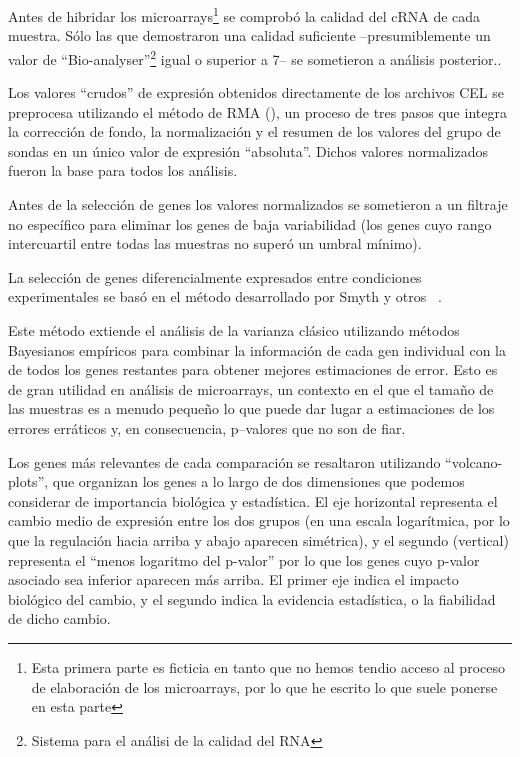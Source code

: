 \documentclass[a4paper]{article}\usepackage[]{graphicx}\usepackage[]{color}
\begin{document}
Antes de hibridar los microarrays\footnote{Esta primera parte es ficticia en tanto que no hemos tendio acceso al proceso de elaboración de los microarrays, por lo que he escrito lo que suele ponerse en esta parte} se comprobó la calidad del cRNA de cada muestra. Sólo las que demostraron una calidad suficiente --presumiblemente un valor de ``Bio-analyser''\footnote{Sistema para el análisi de la calidad del RNA} igual o superior a 7-- se sometieron a análisis posterior.. 

Los valores ``crudos'' de expresión obtenidos directamente de los archivos CEL se preprocesa utilizando el método de RMA (\cite{Irizarry:2003}), un proceso de tres pasos que integra la corrección de fondo, la normalización y el resumen de los valores del grupo de sondas en un único valor de expresión ``absoluta''. Dichos valores normalizados fueron la base para todos los análisis.

Antes de la selección de genes los valores normalizados se sometieron a un filtraje no específico para eliminar los genes de baja 
variabilidad (los genes cuyo rango intercuartil entre todas las muestras no superó un umbral mínimo).

La selección de genes diferencialmente expresados entre condiciones experimentales se basó en el método desarrollado por Smyth y otros ~\cite{Smyth:2004}.


Este método extiende el análisis de la varianza clásico utilizando métodos Bayesianos empíricos para combinar la información de cada gen individual con la de todos los genes restantes para obtener mejores estimaciones de error. Esto es de gran utilidad en análisis de microarrays, un contexto en el que el tamaño de las muestras es a menudo pequeño lo que puede dar lugar a estimaciones de los errores erráticos y, en consecuencia, p--valores que no son de fiar.

Los genes más relevantes de cada comparación se resaltaron utilizando ``volcano-plots'', 
que organizan los genes a lo largo de dos dimensiones que podemos considerar de importancia biológica y estadística. El eje horizontal representa el cambio medio de expresión entre los dos grupos (en una escala logarítmica, por lo que la regulación hacia arriba y abajo aparecen simétrica), y el segundo (vertical) representa el ``menos logaritmo del p-valor'' por lo que los genes cuyo p-valor asociado sea inferior aparecen más arriba. El primer eje indica el impacto biológico del cambio, y el segundo indica la evidencia estadística, o la fiabilidad de dicho cambio.
\end{document}
